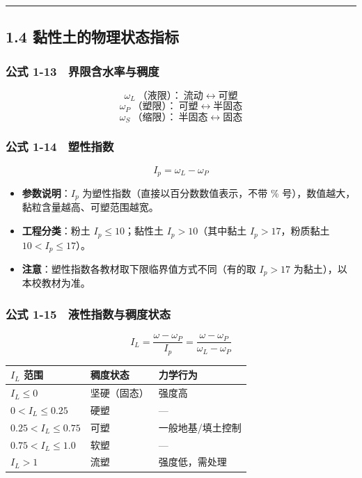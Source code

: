 \documentclass[
]{article}
\newcounter{none} %
\providecommand{\tightlist}{%
  \setlength{\itemsep}{0pt}\setlength{\parskip}{0pt}}
\begin{document}
\begin{center}\rule{0.5\linewidth}{0.5pt}\end{center}

\subsection{1.4
黏性土的物理状态指标}\label{ux9ecfux6027ux571fux7684ux7269ux7406ux72b6ux6001ux6307ux6807}

\subsubsection{公式
1-13　界限含水率与稠度}\label{ux516cux5f0f-1-13-ux754cux9650ux542bux6c34ux7387ux4e0eux7a20ux5ea6}

\[\omega_L\ \text{（液限）：} \ \text{流动}\leftrightarrow\text{可塑}\]
\[\omega_P\ \text{（塑限）：} \ \text{可塑}\leftrightarrow\text{半固态}\]
\[\omega_S\ \text{（缩限）：} \ \text{半固态}\leftrightarrow\text{固态}\]

\subsubsection{公式
1-14　塑性指数}\label{ux516cux5f0f-1-14-ux5851ux6027ux6307ux6570}

\[\boxed{I_p=\omega_L-\omega_P}\]

\begin{itemize}
\tightlist
\item
  \textbf{参数说明}：\(I_p\) 为塑性指数（直接以百分数数值表示，不带 \%
  号），数值越大，黏粒含量越高、可塑范围越宽。
\item
  \textbf{工程分类}：粉土 \(I_p\le10\)；黏性土 \(I_p>10\)（其中黏土
  \(I_p>17\)，粉质黏土 \(10<I_p\le17\)）。
\item
  \textbf{注意}：塑性指数各教材取下限临界值方式不同（有的取 \(I_p>17\)
  为黏土），以本校教材为准。
\end{itemize}

\subsubsection{公式
1-15　液性指数与稠度状态}\label{ux516cux5f0f-1-15-ux6db2ux6027ux6307ux6570ux4e0eux7a20ux5ea6ux72b6ux6001}

\[I_L=\frac{\omega-\omega_P}{I_p}=\frac{\omega-\omega_P}{\omega_L-\omega_P}\]

{\def\LTcaptype{none} %
\begin{longtable}[]{@{}lll@{}}
\toprule\noalign{}
\(I_L\) 范围 & 稠度状态 & 力学行为 \\
\midrule\noalign{}
\endhead
\bottomrule\noalign{}
\endlastfoot
\(I_L\le0\) & 坚硬（固态） & 强度高 \\
\(0<I_L\le0.25\) & 硬塑 & --- \\
\(0.25<I_L\le0.75\) & 可塑 & 一般地基/填土控制 \\
\(0.75<I_L\le1.0\) & 软塑 & --- \\
\(I_L>1\) & 流塑 & 强度低，需处理 \\
\end{longtable}
}
\end{document}
